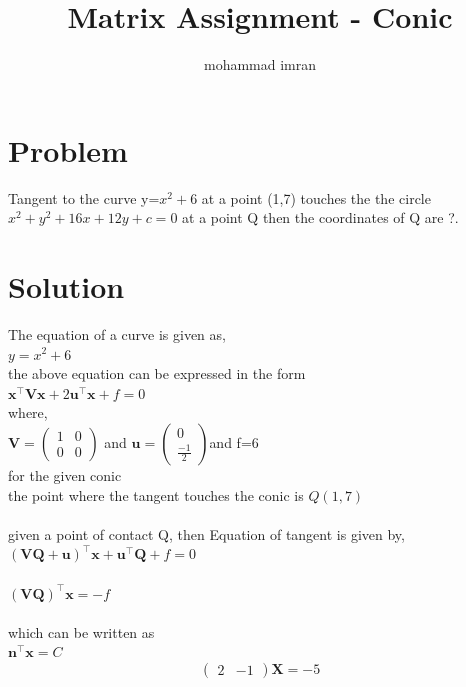 \documentclass[journal,12pt,twocolumn]{article}
\title{\mytitle}
\title{
Matrix Assignment - Conic
}
\author{mohammad imran}
\newcommand{\myvec}[1]{\ensuremath{\begin{pmatrix}#1\end{pmatrix}}}
\let\vec\mathbf
\begin{document}
\maketitle
\tableofcontents
\bigskip


\section{\textbf{Problem}}
Tangent to the curve y=$x^2+6$ at a point (1,7) touches the the circle $x^2+y^2+16x+12y+c=0$ at a point Q then the coordinates of Q are ?. \\


\section{\textbf{Solution}}
The equation of a curve  is given as,  
\\
        $y=x^2+6$ \\
        
 the above equation can be expressed in the form  \\    
${\vec{x^{\top}V x} + 2\vec{u^{\top}x}} + f=0$
\\

where,
\\

$\vec{V}=\myvec{1&0\\ 0&0}$ and $\vec{u}=\myvec{0\\\frac{-1}{2}}$and f=6
\\

for the given conic
\\

the point where the tangent touches the conic is $Q(1,7)$\\
\\
given a point of contact Q,  then Equation of tangent is given by,
\\

$\vec{(VQ +u)^{\top}}\vec{x} + \vec{u^{\top}Q} + f = 0$
\\
\\


$\vec{(VQ)}^{\top}\vec{x} = -f$
\\
\\
which can be written as 
\\

$\vec{n}^{\top}\vec{x} = C$
\\
\begin{equation}
\myvec{2 & -1}\vec{X}=-5
\end{equation}
\\
\end{document}

